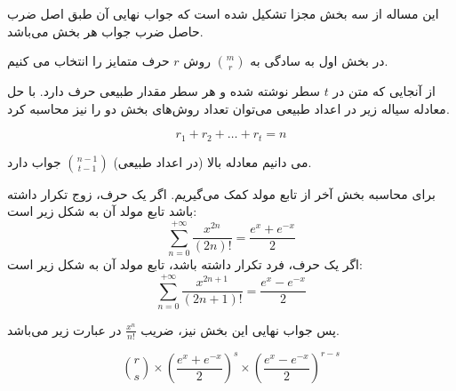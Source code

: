 \p
این مساله از سه بخش مجزا تشکیل شده است که جواب نهایی آن طبق اصل ضرب حاصل ضرب جواب هر بخش می‌باشد.

\p
در بخش اول به سادگی
به
$\binom{m}{r}$
روش $r$ حرف متمایز را انتخاب می کنیم.

\p
از آنجایی که متن در $t$ سطر نوشته شده و هر سطر مقدار طبیعی حرف دارد. با حل معادله سیاله زیر در اعداد طبیعی می‌توان تعداد روش‌های بخش دو را نیز محاسبه کرد.

$$r_1 + r_2 + \ldots + r_t = n$$

می دانیم معادله بالا (در اعداد طبیعی) 
$\binom{n - 1}{t - 1}$
جواب دارد.

\p
برای محاسبه بخش آخر از تابع مولد کمک می‌گیریم.
اگر یک حرف، زوج تکرار داشته باشد تابع مولد آن به شکل زیر است:
\[ \sum_{n=0}^{+\infty} \frac{x^{2n}}{(2n)!} = \frac{e^x + e^{-x}}{2} \]
اگر یک حرف، فرد تکرار داشته باشد، تابع مولد آن به شکل زیر است:
\[ \sum_{n=0}^{+\infty} \frac{x^{2n + 1}}{(2n + 1)!} = \frac{e^x - e^{-x}}{2} \]

\p
پس جواب نهایی این بخش نیز، ضریب
$\frac{x^n}{n!}$
در عبارت زیر می‌باشد.

\[ \binom{r}{s}\times\left({\frac{e^x + e^{-x}}{2}}\right)^s\times\left({\frac{e^x - e^{-x}}{2}}\right)^{r - s} \]